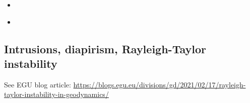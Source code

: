 \begin{scriptsize}
\begin{itemize}
\item[\twothousandeight] 
\textcite{kore08} 
\item[\twothousandtwelve] 
\textcite{nata12} 
\end{itemize}
\end{scriptsize}

\subsection{Intrusions, diapirism, Rayleigh-Taylor instability}

See EGU blog article: 
\url{https://blogs.egu.eu/divisions/gd/2021/02/17/rayleigh-taylor-instability-in-geodynamics/}


